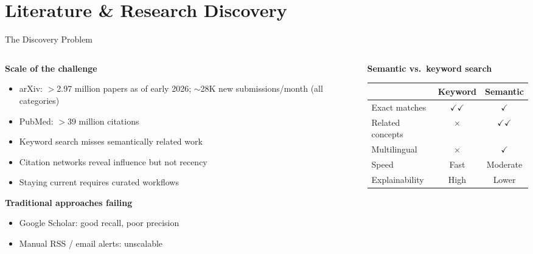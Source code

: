 
\section{Literature \& Research Discovery}

\begin{frame}{The Discovery Problem}
  \begin{columns}[T, onlytextwidth]
    \begin{column}{0.55\textwidth}
      \textbf{Scale of the challenge}\\[0.3em]
      \begin{itemize}
        \item arXiv: $>$2.97 million papers as of early 2026; $\sim$28K new submissions/month (all categories)
        \item PubMed: $>$39 million citations
        \item Keyword search misses semantically related work
        \item Citation networks reveal influence but not recency
        \item Staying current requires curated workflows
      \end{itemize}
      \vspace{0.5em}
      \textbf{Traditional approaches failing}\\[0.3em]
      \begin{itemize}
        \item Google Scholar: good recall, poor precision
        \item Manual RSS / email alerts: unscalable
      \end{itemize}
    \end{column}
    \hfill
    \begin{column}{0.42\textwidth}
      \textbf{Semantic vs.\ keyword search}\\[0.4em]
      \begin{tabular}{lcc}
        \toprule
        & \textbf{Keyword} & \textbf{Semantic} \\
        \midrule
        Exact matches & $\checkmark\checkmark$ & $\checkmark$ \\
        Related concepts & $\times$ & $\checkmark\checkmark$ \\
        Multilingual & $\times$ & $\checkmark$ \\
        Speed & Fast & Moderate \\
        Explainability & High & Lower \\
        \bottomrule
      \end{tabular}
    \end{column}
  \end{columns}
\end{frame}

